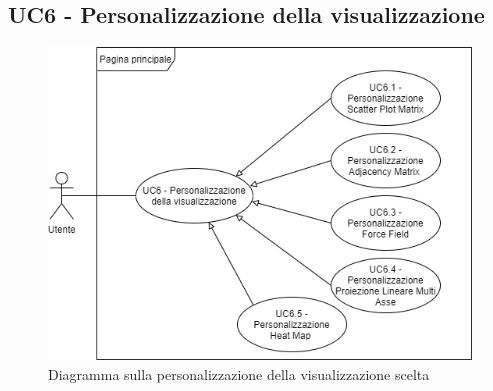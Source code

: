 \newpage
\subsection{UC6 - Personalizzazione della visualizzazione}
\begin{figure}[h]
\includegraphics[width=\linewidth]{Section/Images/UC6.png}
\centering
\caption{Diagramma sulla personalizzazione della visualizzazione scelta}
\end{figure}
